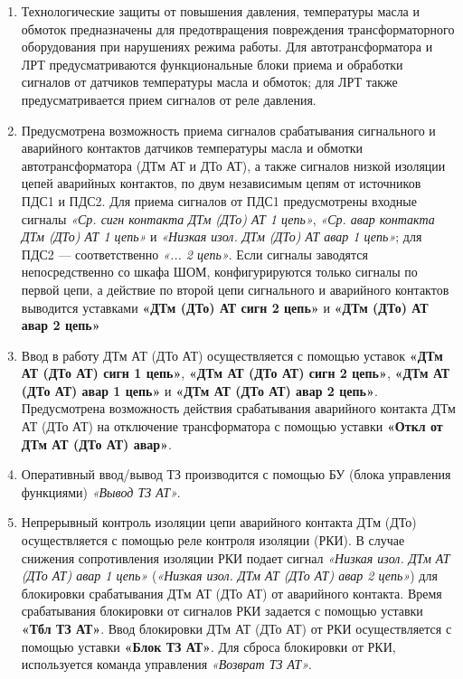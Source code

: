 \documentclass[a4paper, 12pt, table, hidelinks, DIV=calc]{extarticle}
\begin{document}
\begin{enumerate}[label=\arabic{section}.\arabic{subsection}.\arabic*,  align=left, labelsep=4pt, leftmargin=0pt, itemindent=57pt]

\item
Технологические защиты от повышения давления, температуры масла и обмоток предназначены для предотвращения повреждения трансформаторного оборудования при нарушениях режима работы. Для автотрансформатора и ЛРТ предусматриваются функциональные блоки приема и обработки сигналов от датчиков температуры масла и обмоток; для ЛРТ также предусматривается прием сигналов от реле давления.

\item
Предусмотрена возможность приема сигналов срабатывания сигнального и аварийного контактов датчиков температуры масла и обмотки автотрансформатора (ДТм АТ и ДТо АТ), а также сигналов низкой изоляции цепей аварийных контактов, по двум независимым цепям от источников ПДС1 и ПДС2. Для приема сигналов от ПДС1 предусмотрены входные сигналы \textit{«Ср. сигн контакта ДТм (ДТо) АТ 1 цепь»}, \textit{«Ср. авар контакта ДТм (ДТо) АТ 1 цепь»} и \textit{«Низкая изол. ДТм (ДТо) АТ авар 1 цепь»}; для ПДС2 — соответственно \textit{«... 2 цепь»}. Если сигналы заводятся непосредственно со шкафа ШОМ, конфигурируются только сигналы по первой цепи, а действие по второй цепи сигнального и аварийного контактов выводится уставками \textbf{«ДТм (ДТо) АТ сигн 2 цепь»} и \textbf{«ДТм (ДТо) АТ авар 2 цепь»}

\item
Ввод в работу ДТм АТ (ДТо АТ) осуществляется с помощью уставок \textbf{«ДТм АТ (ДТо АТ) сигн 1 цепь»}, \textbf{«ДТм АТ (ДТо АТ) сигн 2 цепь»}, \textbf{«ДТм АТ  (ДТо АТ) авар 1 цепь»} и \textbf{«ДТм АТ (ДТо АТ) авар 2 цепь»}. Предусмотрена возможность действия срабатывания аварийного контакта ДТм АТ (ДТо АТ) на отключение трансформатора с помощью уставки \textbf{«Откл от ДТм АТ (ДТо АТ) авар»}.

\item
Оперативный ввод/вывод ТЗ производится с помощью БУ (блока управления функциями) \textit{«Вывод ТЗ АТ»}.

\item
Непрерывный контроль изоляции цепи аварийного контакта ДТм (ДТо) осуществляется с помощью реле контроля изоляции (РКИ). В случае снижения сопротивления изоляции РКИ подает сигнал \textit{«Низкая изол. ДТм АТ (ДТо АТ) авар 1 цепь»} (\textit{«Низкая изол. ДТм АТ (ДТо АТ) авар 2 цепь»}) для блокировки срабатывания ДТм АТ (ДТо АТ) от аварийного контакта. Время срабатывания блокировки от сигналов РКИ задается с помощью уставки \textbf{«Тбл ТЗ АТ»}. Ввод блокировки ДТм АТ (ДТо АТ) от РКИ осуществляется с помощью уставки \textbf{«Блок ТЗ АТ»}. Для сброса блокировки от РКИ, используется команда управления \textit{«Возврат ТЗ АТ»}.


\end{enumerate}
\end{document}
